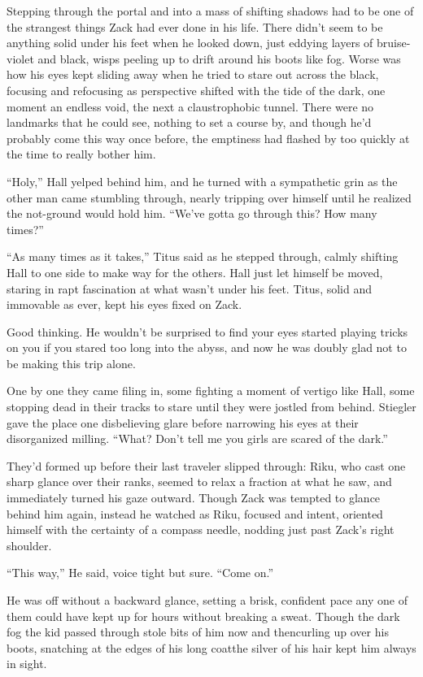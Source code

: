 \renewcommand{\pfbreakdisplay}{%
\ding{33}\quad\ding{33}\quad\ding{33}}
Stepping through the portal and into a mass of shifting shadows had to be one of the strangest things Zack had ever done in his life. There didn't seem to be anything solid under his feet when he looked down, just eddying layers of bruise-violet and black, wisps peeling up to drift around his boots like fog. Worse was how his eyes kept sliding away when he tried to stare out across the black, focusing and refocusing as perspective shifted with the tide of the dark, one moment an endless void, the next a claustrophobic tunnel. There were no landmarks that he could see, nothing to set a course by, and though he'd probably come this way once before, the emptiness had flashed by too quickly at the time to really bother him.

``Holy,'' Hall yelped behind him, and he turned with a sympathetic grin as the other man came stumbling through, nearly tripping over himself until he realized the not-ground would hold him. ``We've gotta go through this? How many times?''

``As many times as it takes,'' Titus said as he stepped through, calmly shifting Hall to one side to make way for the others. Hall just let himself be moved, staring in rapt fascination at what wasn't under his feet. Titus, solid and immovable as ever, kept his eyes fixed on Zack.

Good thinking. He wouldn't be surprised to find your eyes started playing tricks on you if you stared too long into the abyss, and now he was doubly glad not to be making this trip alone.

One by one they came filing in, some fighting a moment of vertigo like Hall, some stopping dead in their tracks to stare until they were jostled from behind. Stiegler gave the place one disbelieving glare before narrowing his eyes at their disorganized milling. 
``What? Don't tell me you girls are scared of the dark.''

They'd formed up before their last traveler slipped through: Riku, who cast one sharp glance over their ranks, seemed to relax a fraction at what he saw, and immediately turned his gaze outward. Though Zack was tempted to glance behind him again, instead he watched as Riku, focused and intent, oriented himself with the certainty of a compass needle, nodding just past Zack's right shoulder.

``This way,'' He said, voice tight but sure. ``Come on.''

He was off without a backward glance, setting a brisk, confident pace any one of them could have kept up for hours without breaking a sweat. Though the dark fog the kid passed through stole bits of him now and then\textemdash curling up over his boots, snatching at the edges of his long coat\textemdash the silver of his hair kept him always in sight.

